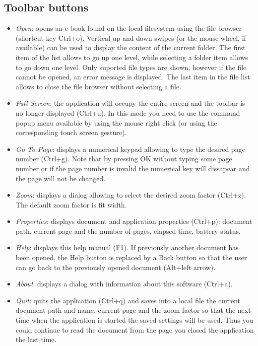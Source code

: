 \documentclass[journal,12pt]{IEEEtran}
\begin{document}
\subsection{Toolbar buttons}
\begin{itemize}
 \item \textit{Open}: opens an e-book found on the local filesystem using the file browser (shortcut key Ctrl+o). Vertical up and down swipes (or the mouse wheel, if available) can be used to display the content of the current folder. The first item of the list allows to go up one level, while selecting a folder item allows to go down one level. Only suported file types are shown, however if the file cannot be opened, an error message is displayed. The last item in the file list allows to close the file browser without selecting a file.
 \item \textit{Full Screen}: the application will occupy the entire screen and the toolbar is no longer displayed (Ctrl+u). In this mode you need to use the command popup menu available by using the mouse right click (or using the corresponding touch screen gesture).
 \item \textit{Go To Page}: displays a numerical keypad allowing to type the desired page number (Ctrl+g). Note that by pressing OK without typing some page number or if the page number is invalid the numerical key will dissapear and the page will not be changed.
 \item \textit{Zoom}: displays a dialog allowing to select the desired zoom factor (Ctrl+z). The default zoom factor is fit width.
 \item \textit{Properties}: displays document and application properties (Ctrl+p): document path, current page and the number of pages, elapsed time, battery status.
 \item \textit{Help}: displays this help manual (F1). If previously another document has been opened, the Help button is replaced by a Back button so that the user can go back to the previously opened document (Alt+left arrow).
 \item \textit{About}: displays a dialog with information about this software (Ctrl+a).
 \item \textit{Quit}: quits the application (Ctrl+q) and saves into a local file the current document path and name, current page and the  zoom factor so that the next time when the application is started the saved settings will be used. Thus you could continue to read the document from the page you closed the application the last time.
\end{itemize}
\end{document}
